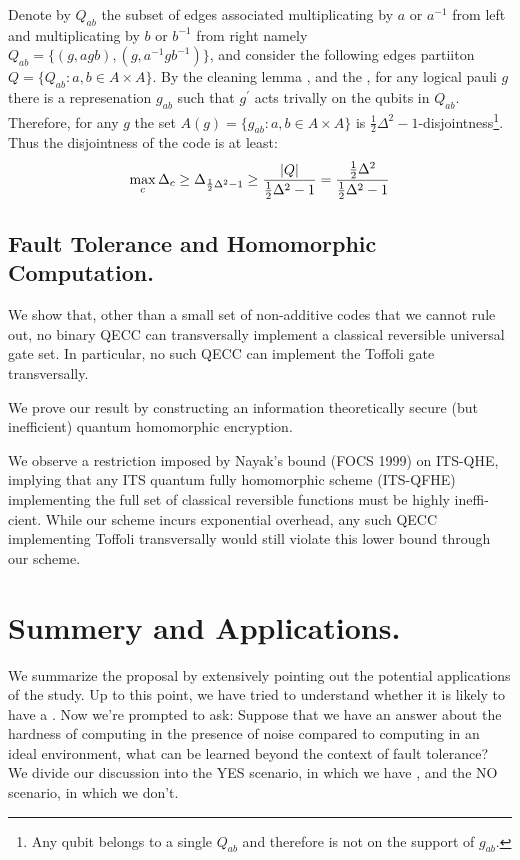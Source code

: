 \documentclass[manuscript,screen,review]{acmart}
\begin{document}
{\begin{enumerate}
  Denote by $Q_{ab}$ the subset of edges associated multiplicating by $a$ or $a^{-1}$ from left and multiplicating by $b$ or $b^{-1}$ from right namely $ Q_{ab} =  \{ (g, agb), (g, a^{-1}gb^{-1}) \} $, and consider the following edges partiiton $Q = \{ Q_{ab} : a,b \in A\times A \}$. By the cleaning lemma \cite{Bravyi_2009}\cite{cleaning_lemm_2}, and the , for any logical pauli $g$ there is a represenation $g_{ab}$ such that $g^{\prime}$ acts trivally on the qubits in $Q_{ab}$. Therefore, for any $g$ the set $ A(g) = \{ g_{ab} : a,b \in A \times A \}$  is $ \frac{1}{2}\Delta^{2}-1$-disjointness\footnote{Any qubit belongs to a single $Q_{ab}$ and therefore is not on the support of $g_{ab}$.}. Thus the disjointness of the code is at least: 
  \begin{equation*}
    \begin{split}
      \max_{c} \Delta_{c} \ge \Delta_{\frac{1}{2} \Delta^{2} - 1 } \ge \frac{  |Q|   }{\frac{1}{2} \Delta^{2} - 1  } = \frac{ \frac{1}{2} \Delta^{2} }{\frac{1}{2} \Delta^{2} - 1 }
    \end{split}
  \end{equation*} 

\end{enumerate}


\subsection{Fault Tolerance and Homomorphic Computation.  }

 We show that, other than a small set of non-additive codes that we cannot rule out, no binary QECC can transversally implement a classical reversible universal gate set. In particular, no such QECC can implement the Toffoli gate transversally.

 We prove our result by constructing an information theoretically secure (but inefficient) quantum homomorphic encryption.

We observe a restriction imposed by Nayak’s bound (FOCS 1999) on ITS-QHE, implying that any ITS quantum fully homomorphic scheme (ITS-QFHE) implementing the full set of classical reversible functions must be highly ineffi- cient. While our scheme incurs exponential overhead, any such QECC implementing Toffoli transversally would still violate this lower bound through our scheme.
\cite{ newman2017limitationstransversalcomputationquantum}


  \section {Summery and Applications.} \label{sec:app}
  We summarize the proposal by extensively pointing out the potential applications of the study. Up to this point, we have tried to understand whether it is likely to have a \CDO. Now we're prompted to ask: Suppose that we have an answer about the hardness of computing in the presence of noise compared to computing in an ideal environment, what can be learned beyond the context of fault tolerance? We divide our discussion into the YES scenario, in which we have \CDO, and the NO scenario, in which we don't.

}
\end{document}
